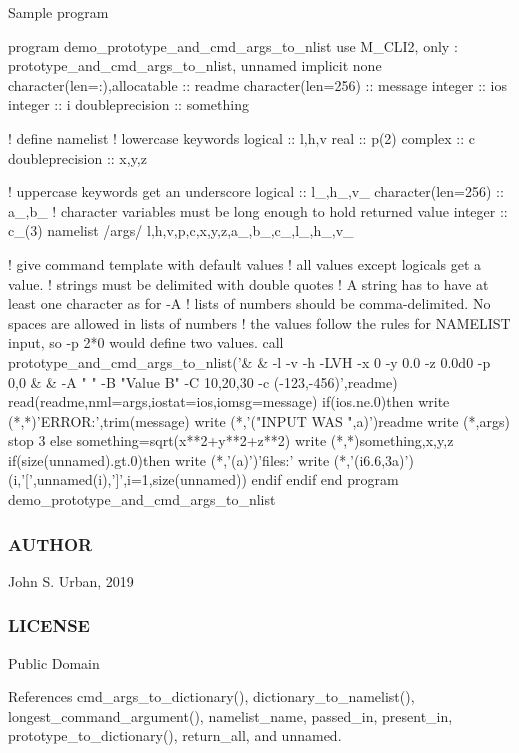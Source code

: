 Sample program \begin{DoxyVerb} program demo_prototype_and_cmd_args_to_nlist
 use M_CLI2,  only : prototype_and_cmd_args_to_nlist, unnamed
 implicit none
 character(len=:),allocatable :: readme
 character(len=256)           :: message
 integer                      :: ios
 integer                      :: i
 doubleprecision              :: something

 ! define namelist
 ! lowercase keywords
 logical            :: l,h,v
 real               :: p(2)
 complex            :: c
 doubleprecision    :: x,y,z

 ! uppercase keywords get an underscore
 logical            :: l_,h_,v_
 character(len=256) :: a_,b_                  ! character variables must be long enough to hold returned value
 integer            :: c_(3)
 namelist /args/ l,h,v,p,c,x,y,z,a_,b_,c_,l_,h_,v_

    ! give command template with default values
    ! all values except logicals get a value.
    ! strings must be delimited with double quotes
    ! A string has to have at least one character as for -A
    ! lists of numbers should be comma-delimited. No spaces are allowed in lists of numbers
    ! the values follow the rules for NAMELIST input, so  -p 2*0 would define two values.
    call prototype_and_cmd_args_to_nlist('&
    & -l -v -h -LVH -x 0 -y 0.0 -z 0.0d0 -p 0,0 &
    & -A " " -B "Value B" -C 10,20,30 -c (-123,-456)',readme)
    read(readme,nml=args,iostat=ios,iomsg=message)
    if(ios.ne.0)then
       write (*,*)'ERROR:',trim(message)
       write (*,'("INPUT WAS ",a)')readme
       write (*,args)
       stop 3
    else
       something=sqrt(x**2+y**2+z**2)
       write (*,*)something,x,y,z
       if(size(unnamed).gt.0)then
          write (*,'(a)')'files:'
          write (*,'(i6.6,3a)')(i,'[',unnamed(i),']',i=1,size(unnamed))
       endif
    endif
 end program demo_prototype_and_cmd_args_to_nlist
\end{DoxyVerb}
 \subsubsection*{A\+U\+T\+H\+OR}

John S. Urban, 2019 \subsubsection*{L\+I\+C\+E\+N\+SE}

Public Domain 

References cmd\+\_\+args\+\_\+to\+\_\+dictionary(), dictionary\+\_\+to\+\_\+namelist(), longest\+\_\+command\+\_\+argument(), namelist\+\_\+name, passed\+\_\+in, present\+\_\+in, prototype\+\_\+to\+\_\+dictionary(), return\+\_\+all, and unnamed.

